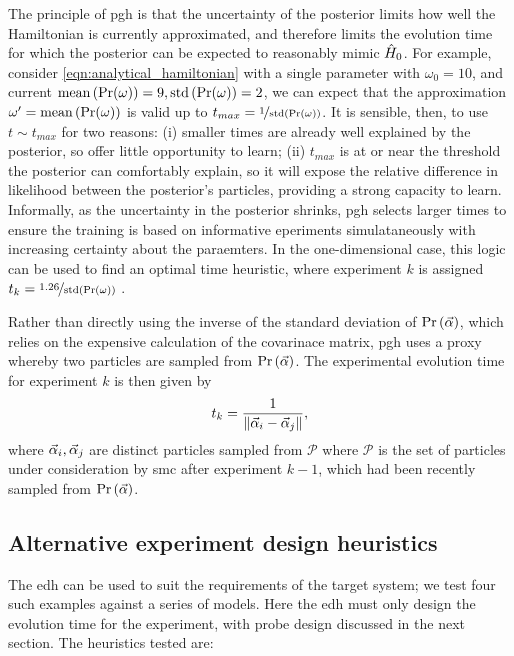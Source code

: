 The principle of \gls{pgh} is that the uncertainty of the posterior limits how well the Hamiltonian is currently 
    approximated, and therefore limits the evolution time for which the posterior can be expected to 
    reasonably mimic $\hat{H}_0$.
For example, consider \cref{eqn:analytical_hamiltonian} with a single parameter with $\omega_0 = 10$,
    and current $\textrm{mean}\left(\Pr(\omega)\right) = 9, \textrm{std}\left(\Pr(\omega)\right) = 2$, 
    we can expect that the approximation $\omega^{\prime} = \textrm{mean}\left(\Pr(\omega)\right)$ 
    is valid up to $t_{max} = \nicefrac{1}{\textrm{std}\left(\Pr(\omega)\right)}$. 
It is sensible, then, to use $t \sim t_{max}$ for two reasons: 
    (i) smaller times are already well explained by the posterior, so offer little opportunity to learn;
    (ii) $t_{max}$ is at or near the threshold the posterior can comfortably explain, 
        so it will expose the relative difference in likelihood between the posterior's particles, 
        providing a strong capacity to learn. 
Informally, as the uncertainty in the posterior shrinks, \gls{pgh} selects larger times 
    to ensure the training is based on informative eperiments simulataneously with increasing 
    certainty about the paraemters. 
In the one-dimensional case, this logic can be used to find an optimal time heuristic, 
    where experiment $k$ is assigned $t_k = \nicefrac{1.26}{\textrm{std}\left(\Pr(\omega)\right)}$ \cite{ferrie2013best}. 
\par
Rather than directly using the inverse of the standard deviation of $\Pr \left(\vec{\alpha}\right)$, 
    which relies on the expensive calculation of the covarinace matrix, 
    \gls{pgh} uses a proxy whereby two particles are sampled from $\Pr \left(\vec{\alpha}\right)$. 
The experimental evolution time for experiment $k$ is then given by 
\begin{equation}
    \label{eqn:pgh_time}
    t_k = \frac{1}{\| \vec{\alpha}_i - \vec{\alpha}_j \|}, 
\end{equation}
    where $\vec{\alpha}_i, \vec{\alpha}_j$ are distinct particles sampled from $\mathcal{P}$ where 
    $\mathcal{P}$ is the set of particles under consideration by \gls{smc} after experiment $k-1$, 
    which had been recently sampled from $\Pr\left(\vec{\alpha}\right)$. 
\par 


\subsection{Alternative experiment design heuristics}\label{sec:alt_heuristics}
The \gls{edh} can be used to suit the requirements of the target system; 
    we test four such examples against a series of models. 
Here the \gls{edh} must only design the evolution time for the experiment, 
    with probe design discussed in the next section. 
The heuristics tested are:

